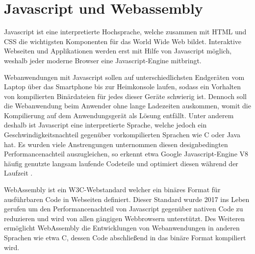 

\section{Javascript und Webassembly}

Javascript ist eine interpretierte Hochsprache, welche zusammen mit HTML und CSS die wichtigsten Komponenten für das World Wide Web bildet. 
Interaktive Webseiten und Applikationen werden erst mit Hilfe von Javascript möglich, weshalb jeder moderne Browser eine Javascript-Engine mitbringt.

Webanwendungen mit Javascript sollen auf unterschiedlichsten Endgeräten vom Laptop über das Smartphone bis zur Heimkonsole laufen, sodass ein Vorhalten von kompilierten Binärdateien für jedes dieser Geräte schwierig ist. Dennoch soll die Webanwendung beim Anwender ohne lange Ladezeiten auskommen, womit die Kompilierung auf dem Anwendungsgerät als Lösung entfällt.
Unter anderem deshalb ist Javascript eine interpretierte Sprache, welche jedoch ein Geschwindigkeitsnachteil gegenüber vorkompilierten Sprachen wie C oder Java hat.
Es wurden viele Anstrengungen unternommen diesen designbedingten Performancenachteil auszugleichen, so erkennt etwa Google Javascript-Engine V8 häufig genutzte langsam laufende Codeteile und optimiert diesen während der Laufzeit \cite{GoogleTurboFan}.

WebAssembly ist ein W3C-Webstandard welcher ein binäres Format für ausführbaren Code in Webseiten definiert. Dieser Standard wurde 2017 ins Leben gerufen um den Performancenachteil von Javascript gegenüber nativen Code zu reduzieren und wird von allen gängigen Webbrowsern unterstützt. Des Weiteren ermöglicht WebAssembly die Entwicklungen von Webanwendungen in anderen Sprachen wie etwa C, dessen Code abschließend in das binäre Format kompiliert wird.


